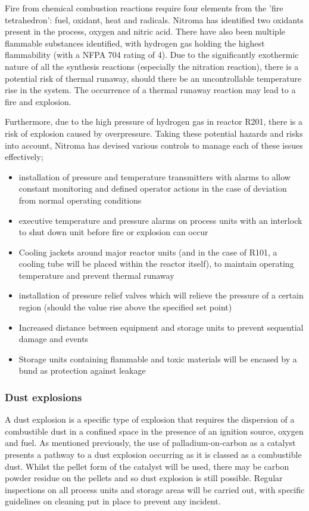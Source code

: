 Fire from chemical combustion reactions require four elements from the 'fire tetrahedron': fuel, oxidant, heat and radicals. Nitroma has identified two oxidants present in the process, oxygen and nitric acid. There have also been multiple flammable substances identified, with hydrogen gas holding the highest flammability (with a NFPA 704 rating of 4). Due to the significantly exothermic nature of all the synthesis reactions (especially the nitration reaction), there is a potential risk of thermal runaway, should there be an uncontrollable temperature rise in the system. The occurrence of a thermal runaway reaction may lead to a fire and explosion.  

Furthermore, due to the high pressure of hydrogen gas in reactor R201, there is a risk of explosion caused by overpressure. Taking these potential hazards and risks into account, Nitroma has devised various controls to manage each of these issues effectively; 


\begin{itemize}
\item installation of pressure and temperature transmitters with alarms to allow constant monitoring and defined operator actions in the case of deviation from normal operating conditions
         \item executive temperature and pressure alarms on process units with an interlock to shut down unit before fire or explosion can occur 
         \item Cooling jackets around major reactor units (and in the case of R101, a cooling tube will be placed within the reactor itself), to maintain operating temperature and prevent thermal runaway 
          \item installation of pressure relief valves which will relieve the pressure of a certain region (should the value rise above the specified set point)
    \item Increased distance between equipment and storage units to prevent sequential damage and events
    \item Storage units containing flammable and toxic materials will be encased by a bund as protection against leakage
\end{itemize}


\subsubsection{Dust explosions}

A dust explosion is a specific type of explosion that requires the dispersion of a combustible dust in a confined space in the presence of an ignition source, oxygen and fuel. As mentioned previously, the use of palladium-on-carbon as a catalyst presents a pathway to a dust explosion occurring as it is classed as a combustible dust. Whilst the pellet form of the catalyst will be used, there may be carbon powder residue on the pellets and so dust explosion is still possible. Regular inspections on all process units and storage areas will be carried out, with specific guidelines on cleaning put in place to prevent any incident. 

